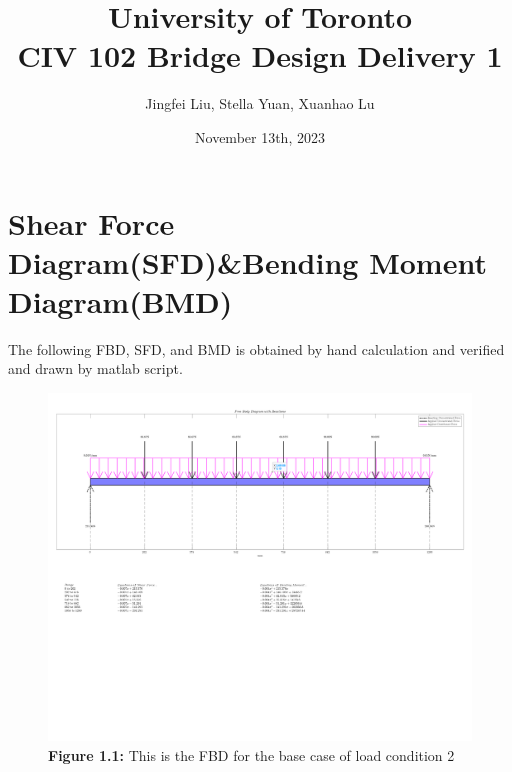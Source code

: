 \documentclass[12pt,titlepage,a4paper]{article}
\begin{document}
\title{University of Toronto \\ CIV 102 Bridge Design Delivery 1}
\author{Jingfei Liu, Stella Yuan, Xuanhao Lu}
\date{November 13th, 2023}
\maketitle


\section{Shear Force Diagram(SFD)\&Bending Moment Diagram(BMD)}
    The following FBD, SFD, and BMD is obtained by hand calculation and verified and drawn by matlab script.
    \begin{figure}[H]
        \centering
        \includegraphics[width=16cm]{Delivery_1_FBD.png}
        \caption*{\textbf{Figure 1.1:} This is the FBD for the base case of load condition 2}
        \label{fig:enter-label}
    \end{figure}
\end{document}
